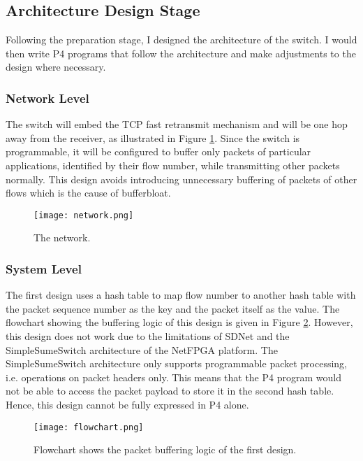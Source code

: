 	\subsection{Architecture Design Stage}
	\label{sec:arch-design}
	Following the preparation stage, I designed the architecture of the switch. I would then write P4 programs that follow the architecture and make adjustments to the design where necessary.
		
	\subsubsection{Network Level}
	The switch will embed the TCP fast retransmit mechanism and will be one hop away from the receiver, as illustrated in Figure \ref{fig:network}. Since the switch is programmable, it will be configured to buffer only packets of particular applications, identified by their flow number, while transmitting other packets normally. This design avoids introducing unnecessary buffering of packets of other flows which is the cause of bufferbloat.
	\begin{figure}[!hb]
		\centering
		\texttt{[image: network.png]}
		\caption{The network.}
		\label{fig:network}
	\end{figure}

	\subsubsection{System Level}
	The first design uses a hash table to map flow number to another hash table with the packet sequence number as the key and the packet itself as the value. The flowchart showing the buffering logic of this design is given in Figure \ref{fig:flowchart}. However, this design does not work due to the limitations of SDNet and the SimpleSumeSwitch architecture of the NetFPGA platform. The SimpleSumeSwitch architecture only supports programmable packet processing, i.e. operations on packet headers only. This means that the P4 program would not be able to access the packet payload to store it in the second hash table. Hence, this design cannot be fully expressed in P4 alone.
	
	\begin{landscape}
		\begin{figure}[!ht]
			\centering
			\texttt{[image: flowchart.png]}
			\caption{Flowchart shows the packet buffering logic of the first design.}
			\label{fig:flowchart}
		\end{figure}
	\end{landscape}
	
